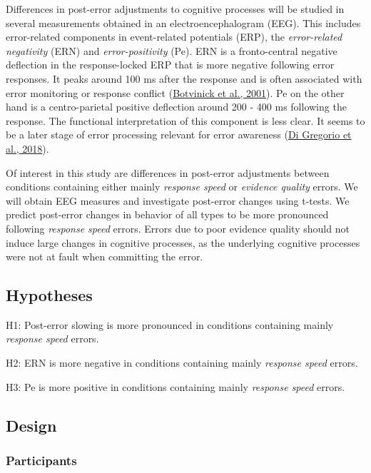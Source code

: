 \documentclass[
  man,floatsintext]{apa7}
\begin{document}
Differences in post-error adjustments to cognitive processes will be studied in several measurements obtained in an electroencephalogram (EEG). This includes error-related components in event-related potentials (ERP), the \emph{error-related negativity} (ERN) and \emph{error-positivity} (Pe).
ERN is a fronto-central negative deflection in the response-locked ERP that is more negative following error responses. It peaks around 100 ms after the response and is often associated with error monitoring or response conflict (\protect\hyperlink{ref-botvinick2001conflict}{Botvinick et al., 2001}).
Pe on the other hand is a centro-parietal positive deflection around 200 - 400 ms following the response. The functional interpretation of this component is less clear. It seems to be a later stage of error processing relevant for error awareness (\protect\hyperlink{ref-di2018errors}{Di Gregorio et al., 2018}).

Of interest in this study are differences in post-error adjustments between conditions containing either mainly \emph{response speed} or \emph{evidence quality} errors. We will obtain EEG measures and investigate post-error changes using t-tests. We predict post-error changes in behavior of all types to be more pronounced following \emph{response speed} errors. Errors due to poor evidence quality should not induce large changes in cognitive processes, as the underlying cognitive processes were not at fault when committing the error.

\hypertarget{hypotheses}{%
\subsection{Hypotheses}\label{hypotheses}}

H1: Post-error slowing is more pronounced in conditions containing mainly \emph{response speed} errors.

H2: ERN is more negative in conditions containing mainly \emph{response speed} errors.

H3: Pe is more positive in conditions containing mainly \emph{response speed} errors.

\hypertarget{design}{%
\subsection{Design}\label{design}}

\hypertarget{participants}{%
\subsubsection{Participants}\label{participants}}
\end{document}
